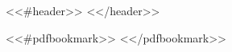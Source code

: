 <<#header>>
<</header>>

<<#pdfbookmark>>
<</pdfbookmark>>

\begingroup

\makeatletter
\@twosidefalse
\makeatother

\tableofcontents
\clearpage

\let\clearpage\relax
\listoffigures
\listoftables
\listofalgorithms
\lstlistoflistings

\endgroup
